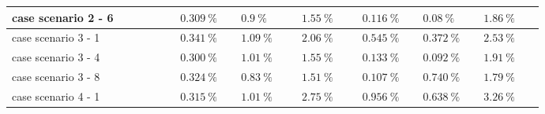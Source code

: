 \documentclass[12pt,a4paper]{scrartcl}
\begin{document}
\begin{onehalfspace}
\begin{center}
\begin{longtable}{p{0.25\linewidth}|p{0.09\linewidth}|p{0.09\linewidth}|p{0.09\linewidth}|p{0.09\linewidth}|p{0.09\linewidth}|p{0.09\linewidth}}
		case scenario 2 - 6 & \hspace*{\fill} $\SI{0.309}{\percent}$ & \hspace*{\fill} $\SI{0.9}{\percent}$ & \hspace*{\fill} $\SI{1.55}{\percent}$ & \hspace*{\fill} $\SI{0.116}{\percent}$ & \hspace*{\fill} $\SI{0.08}{\percent}$ & \hspace*{\fill} $\SI{1.86}{\percent}$\\
		\hline
		case scenario 3 - 1 & \hspace*{\fill} $\SI{0.341}{\percent}$ & \hspace*{\fill} $\SI{1.09}{\percent}$ & \hspace*{\fill} $\SI{2.06}{\percent}$ & \hspace*{\fill} $\SI{0.545}{\percent}$ & \hspace*{\fill} $\SI{0.372}{\percent}$ & \hspace*{\fill} $\SI{2.53}{\percent}$\\		
		case scenario 3 - 4 & \hspace*{\fill} $\SI{0.300}{\percent}$ & \hspace*{\fill} $\SI{1.01}{\percent}$ & \hspace*{\fill} $\SI{1.55}{\percent}$ & \hspace*{\fill} $\SI{0.133}{\percent}$ & \hspace*{\fill} $\SI{0.092}{\percent}$ & \hspace*{\fill} $\SI{1.91}{\percent}$\\		
		case scenario 3 - 8 & \hspace*{\fill} $\SI{0.324}{\percent}$ & \hspace*{\fill} $\SI{0.83}{\percent}$ & \hspace*{\fill} $\SI{1.51}{\percent}$ & \hspace*{\fill} $\SI{0.107}{\percent}$ & \hspace*{\fill} $\SI{0.740}{\percent}$ & \hspace*{\fill} $\SI{1.79}{\percent}$\\	
		\hline
		case scenario 4 - 1 & \hspace*{\fill} $\SI{0.315}{\percent}$ & \hspace*{\fill} $\SI{1.01}{\percent}$ & \hspace*{\fill} $\SI{2.75}{\percent}$ & \hspace*{\fill} $\SI{0.956}{\percent}$ & \hspace*{\fill} $\SI{0.638}{\percent}$ & \hspace*{\fill} $\SI{3.26}{\percent}$\\		

\end{longtable}
\end{center}
\end{onehalfspace}
\end{document}
